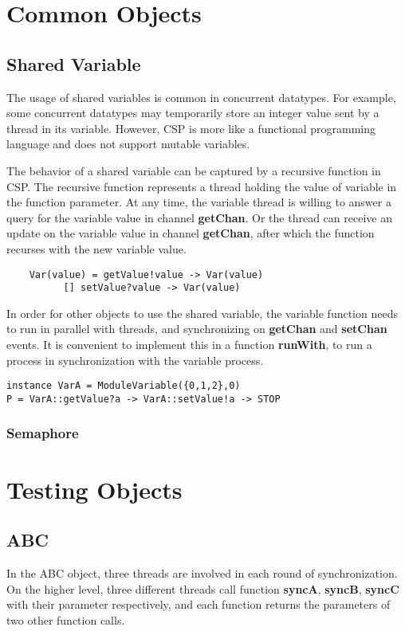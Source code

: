 \documentclass{article}
\begin{document}
\section{Common Objects}
\subsection{Shared Variable}
The usage of shared variables is common in concurrent datatypes. For example, some concurrent datatypes may temporarily store an integer value sent by a thread in its variable. However, CSP is more like a functional programming language and does not support mutable variables. 

The behavior of a shared variable can be captured by a recursive function in CSP. The recursive function represents a thread holding the value of variable in the function parameter. At any time, the variable thread is willing to answer a query for the variable value in channel \textbf{getChan}. Or the thread can receive an update on the variable value in channel \textbf{getChan}, after which the function recurses with the new variable value.

\begin{verbatim}
    Var(value) = getValue!value -> Var(value)
          [] setValue?value -> Var(value)  
\end{verbatim}
In order for other objects to use the shared variable, the variable function needs to run in parallel with threads, and synchronizing on \textbf{getChan} and \textbf{setChan} events. It is convenient to implement this in a function \textbf{runWith}, to run a process in synchronization with the variable process.

\begin{verbatim}
instance VarA = ModuleVariable({0,1,2},0)
P = VarA::getValue?a -> VarA::setValue!a -> STOP
\end{verbatim}

\subsubsection{Semaphore}


\section{Testing Objects}
\subsection{ABC}
In the ABC object, three threads are involved in each round of synchronization. On the higher level, three different threads call function \textbf{syncA}, \textbf{syncB}, \textbf{syncC} with their parameter respectively, and each function returns the parameters of two other function calls.
\end{document}
